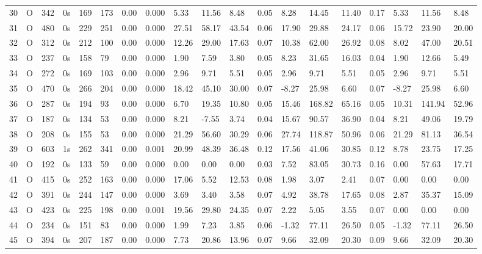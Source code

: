 \begin{tabular}{rllllllrlllllllllll}
30 & O & 342 & 0s & 169 & 173 & 0.00 & 0.000 & 5.33 & 11.56 & 8.48 & 0.05 & 8.28 & 14.45 & 11.40 & 0.17 & 5.33 & 11.56 & 8.48 \\
31 & O & 480 & 0s & 229 & 251 & 0.00 & 0.000 & 27.51 & 58.17 & 43.54 & 0.06 & 17.90 & 29.88 & 24.17 & 0.06 & 15.72 & 23.90 & 20.00 \\
32 & O & 312 & 0s & 212 & 100 & 0.00 & 0.000 & 12.26 & 29.00 & 17.63 & 0.07 & 10.38 & 62.00 & 26.92 & 0.08 & 8.02 & 47.00 & 20.51 \\
33 & O & 237 & 0s & 158 & 79 & 0.00 & 0.000 & 1.90 & 7.59 & 3.80 & 0.05 & 8.23 & 31.65 & 16.03 & 0.04 & 1.90 & 12.66 & 5.49 \\
34 & O & 272 & 0s & 169 & 103 & 0.00 & 0.000 & 2.96 & 9.71 & 5.51 & 0.05 & 2.96 & 9.71 & 5.51 & 0.05 & 2.96 & 9.71 & 5.51 \\
35 & O & 470 & 0s & 266 & 204 & 0.00 & 0.000 & 18.42 & 45.10 & 30.00 & 0.07 & -8.27 & 25.98 & 6.60 & 0.07 & -8.27 & 25.98 & 6.60 \\
36 & O & 287 & 0s & 194 & 93 & 0.00 & 0.000 & 6.70 & 19.35 & 10.80 & 0.05 & 15.46 & 168.82 & 65.16 & 0.05 & 10.31 & 141.94 & 52.96 \\
37 & O & 187 & 0s & 134 & 53 & 0.00 & 0.000 & 8.21 & -7.55 & 3.74 & 0.04 & 15.67 & 90.57 & 36.90 & 0.04 & 8.21 & 49.06 & 19.79 \\
38 & O & 208 & 0s & 155 & 53 & 0.00 & 0.000 & 21.29 & 56.60 & 30.29 & 0.06 & 27.74 & 118.87 & 50.96 & 0.06 & 21.29 & 81.13 & 36.54 \\
39 & O & 603 & 1s & 262 & 341 & 0.00 & 0.001 & 20.99 & 48.39 & 36.48 & 0.12 & 17.56 & 41.06 & 30.85 & 0.12 & 8.78 & 23.75 & 17.25 \\
40 & O & 192 & 0s & 133 & 59 & 0.00 & 0.000 & 0.00 & 0.00 & 0.00 & 0.03 & 7.52 & 83.05 & 30.73 & 0.16 & 0.00 & 57.63 & 17.71 \\
41 & O & 415 & 0s & 252 & 163 & 0.00 & 0.000 & 17.06 & 5.52 & 12.53 & 0.08 & 1.98 & 3.07 & 2.41 & 0.07 & 0.00 & 0.00 & 0.00 \\
42 & O & 391 & 0s & 244 & 147 & 0.00 & 0.000 & 3.69 & 3.40 & 3.58 & 0.07 & 4.92 & 38.78 & 17.65 & 0.08 & 2.87 & 35.37 & 15.09 \\
43 & O & 423 & 0s & 225 & 198 & 0.00 & 0.001 & 19.56 & 29.80 & 24.35 & 0.07 & 2.22 & 5.05 & 3.55 & 0.07 & 0.00 & 0.00 & 0.00 \\
44 & O & 234 & 0s & 151 & 83 & 0.00 & 0.000 & 1.99 & 7.23 & 3.85 & 0.06 & -1.32 & 77.11 & 26.50 & 0.05 & -1.32 & 77.11 & 26.50 \\
45 & O & 394 & 0s & 207 & 187 & 0.00 & 0.000 & 7.73 & 20.86 & 13.96 & 0.07 & 9.66 & 32.09 & 20.30 & 0.09 & 9.66 & 32.09 & 20.30 \\

\end{tabular}
